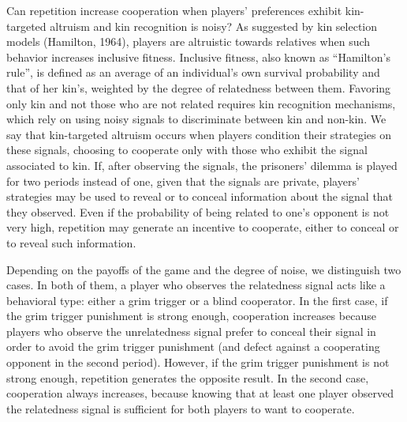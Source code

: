 \documentclass[12pt]{article}
\begin{document}
Can repetition increase cooperation when players' preferences
exhibit kin-targeted altruism and kin recognition is noisy? As suggested by 
kin selection models (Hamilton, 1964), players are altruistic towards relatives when such behavior increases inclusive fitness. Inclusive fitness, also known as ``Hamilton's rule'', is defined as an average of an individual's own survival probability and that of her kin's, weighted by the degree of relatedness between them. Favoring only kin and not those who are not related requires kin recognition mechanisms, which rely on using noisy signals to discriminate between kin and non-kin. We say that kin-targeted altruism occurs when players condition their strategies on these signals, choosing to cooperate only with those who exhibit the signal associated to kin. If, after observing the signals, the prisoners' dilemma is played for two periods instead of one, given that the signals are private, players' strategies may be used to reveal or to conceal information about the signal that they observed. Even if the probability of being related to one's opponent is not very high, repetition may generate an incentive to cooperate, either to conceal or to reveal such information. 


Depending on the payoffs of the game and the degree of noise, we distinguish two cases. In both of them, a player who observes the relatedness signal acts like a behavioral type: either a grim trigger or a blind cooperator. In the first case, if the grim trigger punishment is strong enough, cooperation increases because players who observe the unrelatedness signal prefer to conceal their signal in order to avoid the grim trigger punishment (and defect against a cooperating opponent in the second period). However, if the grim trigger punishment is not strong enough, repetition generates the opposite result. In the second case, cooperation always increases, because knowing that at least one player observed the relatedness signal is sufficient for both players to want to cooperate.
\end{document}
